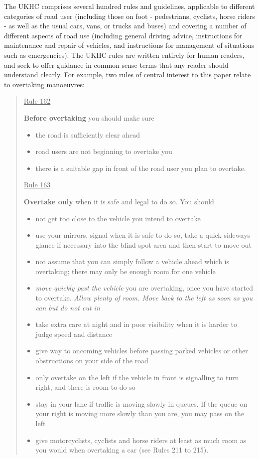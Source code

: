 The UKHC comprises several hundred rules and guidelines, applicable to different categories of road user (including those on foot - pedestrians, cyclists, horse riders - as well as the usual cars, vans, or trucks and buses) and covering a number of different aspects of road use (including general driving advice, instructions for maintenance and repair of vehicles, and instructions for management of situations such as emergencies). The UKHC rules are written entirely for human readers, and seek to offer guidance in common sense terms that any reader should understand clearly. For example, two rules of central interest to this paper relate to overtaking manoeuvres:

\begin{quote}
    \underline{Rule 162}
    
    \textbf{Before overtaking} you should make sure
    \begin{itemize}
        \item the road is sufficiently clear ahead
        \item road users are not beginning to overtake you
        \item there is a suitable gap in front of the road user you plan to overtake.
    \end{itemize}

    \underline{Rule 163}
    
    \textbf{Overtake only} when it is safe and legal to do so. You should
    \begin{itemize}
        \item not get too close to the vehicle you intend to overtake
        \item use your mirrors, signal when it is safe to do so, take a quick sideways glance if necessary into the blind spot area and then start to move out
        \item not assume that you can simply follow a vehicle ahead which is overtaking; there may only be enough room for one vehicle
        \item \emph{move quickly past the vehicle} you are overtaking, once you have started to overtake. \emph{Allow plenty of room. Move back to the left as soon as you can but do not cut in}
        \item take extra care at night and in poor visibility when it is harder to judge speed and distance
        \item give way to oncoming vehicles before passing parked vehicles or other obstructions on your side of the road
        \item only overtake on the left if the vehicle in front is signalling to turn right, and there is room to do so
        \item stay in your lane if traffic is moving slowly in queues. If the queue on your right is moving more slowly than you are, you may pass on the left
        \item give motorcyclists, cyclists and horse riders at least as much room as you would when overtaking a car (see Rules 211 to 215).
    \end{itemize}
\end{quote}

